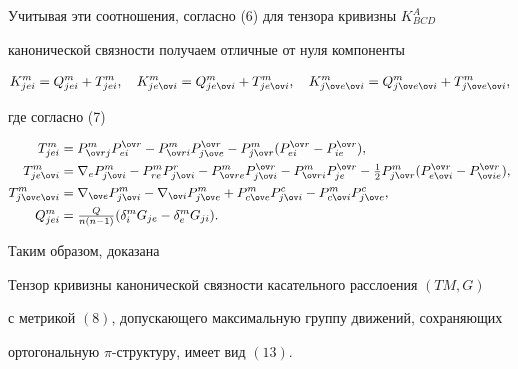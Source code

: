 Учитывая эти соотношения, согласно (6) для тензора кривизны $K^A_{BCD}$


канонической связности получаем отличные от нуля компоненты


\begin{equation}


K^m_{jei}=Q^m_{jei}+T^m_{jei},\quad


K^m_{je\ov i}=Q^m_{je\ov i}+T^m_{je\ov i},\quad


K^m_{j\ov e\ov i}=Q^m_{j\ov e\ov i}+T^m_{j\ov e\ov i},


\end{equation}


где согласно (7)


\begin{align*}


T^m_{jei}&=P^m_{\ov r j}P^{\ov r}_{ei}-


P^m_{\ov r i}P^{\ov r}_{j\ov e}-P^m_{j\ov r}


(P^{\ov r}_{ei}-P^{\ov r}_{ie}), \\


T^m_{je\ov i}&=\nabla_e P^m_{j\ov i}-P^m_{re}P^r_{j\ov i}-


P^m_{\ov r e}P^{\ov r}_{j\ov i}-


P^m_{\ov r i}P^{\ov r}_{je}-\tfrac{1}{2}P^m_{j\ov r}


(P^{\ov r}_{e\ov i}-P^{\ov r}_{\ov i e}), \\


T^m_{j\ov e\ov i}&=\nabla_{\ov e}P^m_{j\ov i}-


\nabla_{\ov i}P^m_{j\ov e}+P^m_{c\ov e}P^c_{j\ov i}-


P^m_{c\ov i}P^c_{j\ov e}, \\


Q^m_{jei}&=\tfrac{Q}{n(n-1)}(\delta^m_i G_{je}-


\delta^m_e G_{ji}).


\end{align*}





Таким образом, доказана





\begin{thm}


Тензор кривизны канонической связности касательного расслоения $(TM,G)$


с метрикой $(8)$, допускающего максимальную группу движений, сохраняющих


ортогональную $\pi$-структуру, имеет вид $(13)$.


\end{thm}





